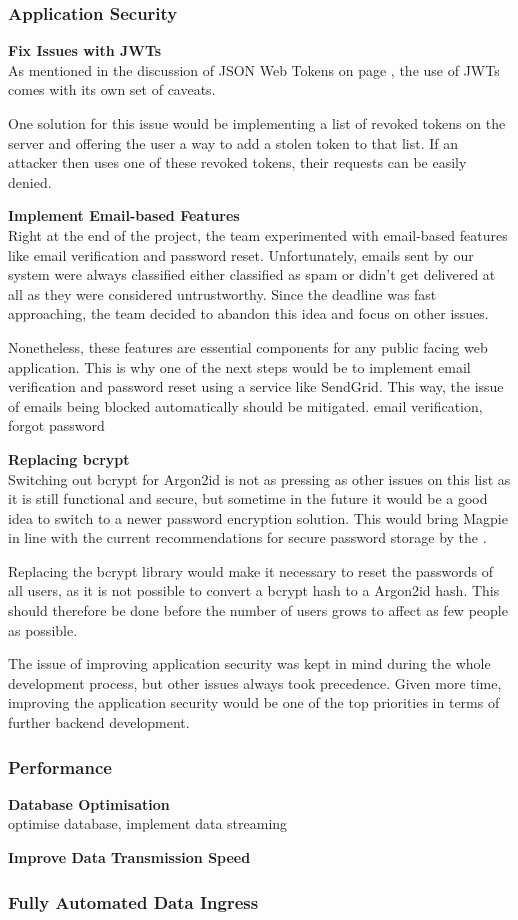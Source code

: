 \subsubsection{Application Security}
\textbf{Fix Issues with JWTs}\\
As mentioned in the discussion of JSON Web Tokens on page \pageref{jwt}, the use
of JWTs comes with its own set of caveats.

One solution for this issue would be implementing a list of revoked tokens on
the server and offering the user a way to add a stolen token to that list. If an
attacker then uses one of these revoked tokens, their requests can be easily
denied.

\textbf{Implement Email-based Features}\\
Right at the end of the project, the team experimented with email-based features
like email verification and password reset. Unfortunately, emails sent by our
system were always classified either classified as spam or didn't get delivered
at all as they were considered untrustworthy. Since the deadline was fast
approaching, the team decided to abandon this idea and focus on other issues.

Nonetheless, these features are essential components for any public facing web
application. This is why one of the next steps would be to implement email
verification and password reset using a service like SendGrid. This way, the
issue of emails being blocked automatically should be mitigated. email
verification, forgot password

\textbf{Replacing bcrypt}\\
Switching out bcrypt for Argon2id is not as pressing as other issues on this
list as it is still functional and secure, but sometime in the future it would
be a good idea to switch to a newer password encryption solution. This would
bring Magpie in line with the current recommendations for secure password
storage by the \textcite{owasp_password_storage_cheatsheet}.

Replacing the bcrypt library would make it necessary to reset the passwords of
all users, as it is not possible to convert a bcrypt hash to a Argon2id hash.
This should therefore be done before the number of users grows to affect as few
people as possible.

The issue of improving application security was kept in mind during the whole
development process, but other issues always took precedence. Given more time,
improving the application security would be one of the top priorities in terms
of further backend development.

\subsubsection{Performance}
\textbf{Database Optimisation}\\
optimise database, implement data streaming

\textbf{Improve Data Transmission Speed}\\

\subsubsection{Fully Automated Data Ingress}
